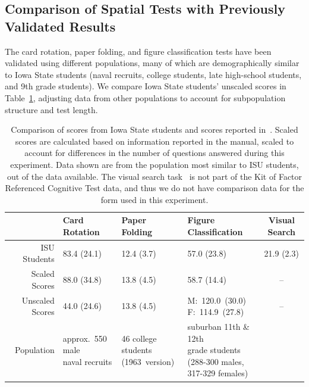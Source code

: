 \documentclass[11pt]{isuthesis}\usepackage[]{graphicx}\usepackage[]{color}
\begin{document}
\subsection{Comparison of Spatial Tests with Previously Validated Results}
The card rotation, paper folding, and figure classification tests have been validated using different populations, many of which are demographically similar to Iowa State students (naval recruits, college students, late high-school students, and 9th grade students). We compare Iowa State students' unscaled scores in Table~\ref{tab:scorecomparison}, adjusting data from other populations to account for subpopulation structure and test length. 

\begin{table}[htb]
\begin{tabular}{rlllc}
\hline
  & Card Rotation & Paper Folding & Figure Classification & Visual Search  \\\hline
ISU Students & 83.4 (24.1) 
             & 12.4 (3.7)
             & 57.0 (23.8)\footnotemark[1]
             & 21.9 (2.3)\\
Scaled Scores & 88.0 (34.8)
              & 13.8 (4.5)
              & 58.7 (14.4)\footnotemark[2]
              & -- \\
Unscaled Scores & 44.0 (24.6)\footnotemark[3]
                & 13.8 (4.5)
                & \parbox[c]{.2\linewidth}{M:~120.0~(30.0)\\ F:~114.9~(27.8)}
                & --\\\hline
{\footnotesize Population}    
              & \parbox[t]{.15\linewidth}{\footnotesize approx.\ 550 male\\ naval recruits} 
              & \parbox[t]{.17\linewidth}{\footnotesize 46 college students\\(1963~version)}
              & \parbox[t]{.2\linewidth}{\footnotesize suburban 11th \& 12th \\ grade students\\(288-300 males, \\317-329 females)}
              & \\\hline
\end{tabular}
\caption[Comparison of scores for cognitive tasks.]{Comparison of scores from Iowa State students and scores reported in~\protect\citep{ekstrom1976manual}. Scaled scores are calculated based on information reported in the manual, scaled to account for differences in the number of questions answered during this experiment. Data shown are from the population most similar to ISU students, out of the data available. The visual search task~\protect\citep{goldstein1973validity,demita1981validity,moerland1986neuropsychological} is not part of the Kit of Factor Referenced Cognitive Test data, and thus we do not have comparison data for the form used in this experiment.
\label{tab:scorecomparison}}
\end{table}
\end{document}
